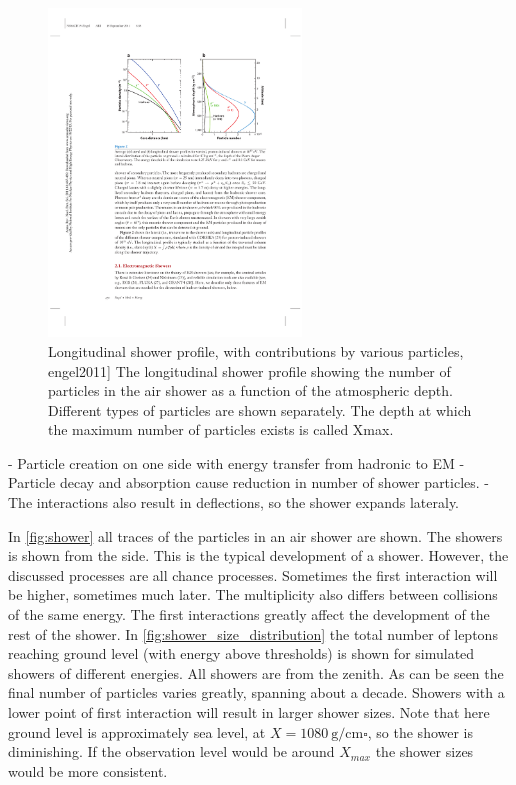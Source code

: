 \begin{figure}
    \centering
    \includegraphics[width=0.6\textwidth]
                    {plots/cosmic-rays/longitudinal_profile}
    \caption{Longitudinal shower profile, with contributions by various particles, engel2011]
The longitudinal shower profile showing the number of particles in the air shower as a function of the atmospheric depth. Different types of particles are shown separately. The depth at which the maximum number of particles exists is called Xmax.}
    \label{fig:longitudinal_profile}
\end{figure}


- Particle creation on one side with energy transfer from hadronic to EM
- Particle decay and absorption cause reduction in number of shower particles.
- The interactions also result in deflections, so the shower expands lateraly.


In \cref{fig:shower} all traces of the particles in an air shower are shown. The showers is shown from the side. This is the typical development of a shower. However, the discussed processes are all chance processes. Sometimes the first interaction will be higher, sometimes much later. The multiplicity also differs between collisions of the same energy. The first interactions greatly affect the development of the rest of the shower. In \cref{fig:shower_size_distribution} the total number of leptons reaching ground level (with energy above thresholds) is shown for simulated showers of different energies. All showers are from the zenith. As can be seen the final number of particles varies greatly, spanning about a decade. Showers with a lower point of first interaction will result in larger shower sizes. Note that  here ground level is approximately sea level, at $X = \SI{1080}{\gram\per\centi\meter\square}$, so the shower is diminishing. If the observation level would be around $X_{max}$ the shower sizes would be more consistent.

